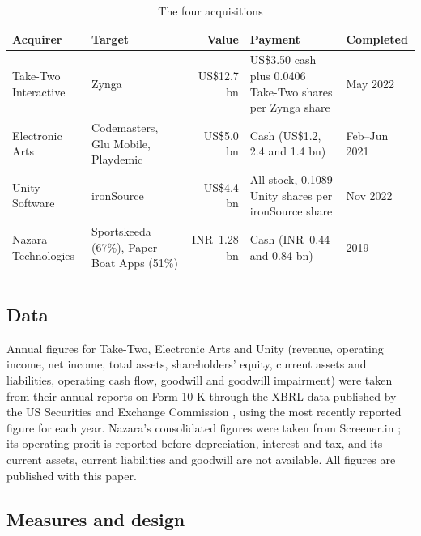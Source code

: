 \documentclass[sn-basic]{sn-jnl}
\newcommand{\USD}{US\$}
\newcommand{\INR}{INR~}
\begin{document}
\begin{table}[h]
\caption{The four acquisitions}\label{tab:deals}
\footnotesize
\setlength{\tabcolsep}{4pt}
\begin{tabular}{@{}p{2.2cm}p{2.5cm}rp{3.8cm}l@{}}
\toprule
Acquirer & Target & Value & Payment & Completed \\
\midrule
Take-Two Interactive & Zynga & \USD 12.7 bn & \USD 3.50 cash plus 0.0406 Take-Two shares per Zynga share & May 2022 \\
Electronic Arts & Codemasters, Glu Mobile, Playdemic & \USD 5.0 bn & Cash (\USD 1.2, 2.4 and 1.4 bn) & Feb--Jun 2021 \\
Unity Software & ironSource & \USD 4.4 bn & All stock, 0.1089 Unity shares per ironSource share & Nov 2022 \\
Nazara Technologies & Sportskeeda (67\%), Paper Boat Apps (51\%) & \INR 1.28 bn & Cash (\INR 0.44 and 0.84 bn) & 2019 \\
\botrule
\end{tabular}
\end{table}

\subsection{Data}

Annual figures for Take-Two, Electronic Arts and Unity (revenue, operating income, net income, total assets, shareholders' equity, current assets and liabilities, operating cash flow, goodwill and goodwill impairment) were taken from their annual reports on Form 10-K through the XBRL data published by the US Securities and Exchange Commission \citep{secttwo,secea,secunity}, using the most recently reported figure for each year. Nazara's consolidated figures were taken from Screener.in \citep{screener}; its operating profit is reported before depreciation, interest and tax, and its current assets, current liabilities and goodwill are not available. All figures are published with this paper.

\subsection{Measures and design}
\end{document}
